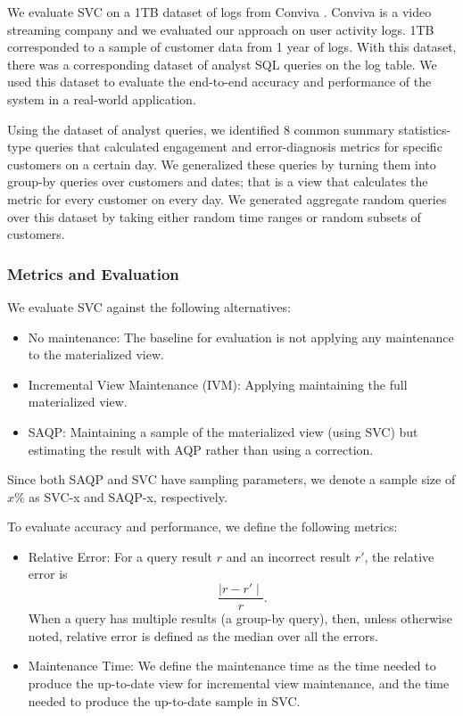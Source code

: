 We evaluate SVC on a 1TB dataset of logs from Conviva \cite{conviva}.
Conviva is a video streaming company and we evaluated our approach on user activity logs.
1TB corresponded to a sample of customer data from 1 year of logs. \reminder{[privacy]}
With this dataset, there was a corresponding dataset of analyst SQL queries on the log table.
We used this dataset to evaluate the end-to-end accuracy and performance of the system in a real-world application.

Using the dataset of analyst queries, we identified 8 common summary statistics-type queries that calculated engagement and error-diagnosis metrics for specific customers on a certain day.
We generalized these queries by turning them into group-by queries over customers and dates; that is a view that calculates the metric for every customer on every day.
We generated aggregate random queries over this dataset by taking either random time ranges or random subsets of customers.

\subsubsection{Metrics and Evaluation}
We evaluate SVC against the following alternatives:
\begin{itemize}
\item No maintenance: The baseline for evaluation is not applying any maintenance to the materialized view.
\item Incremental View Maintenance (IVM): Applying maintaining the full materialized view. 
\item SAQP: Maintaining a sample of the materialized view (using SVC) but estimating the result with AQP rather than using 
a correction. 

\end{itemize}
Since both SAQP and SVC have sampling parameters, we denote a sample size of $x \% $ as SVC-x and SAQP-x, respectively. 

To evaluate accuracy and performance, we define the following metrics:
\begin{itemize}
\item Relative Error: For a query result $r$ and an incorrect result $r'$, the relative error is \[\frac{\mid r-r' \mid}{r}.\] 
When a query has multiple results (a group-by query), then, unless otherwise noted, relative error is defined as the median over all the errors.
\item Maintenance Time: We define the maintenance time as the time needed to produce the up-to-date view for incremental view maintenance, and the time needed to produce the up-to-date sample in SVC. 
\end{itemize}

